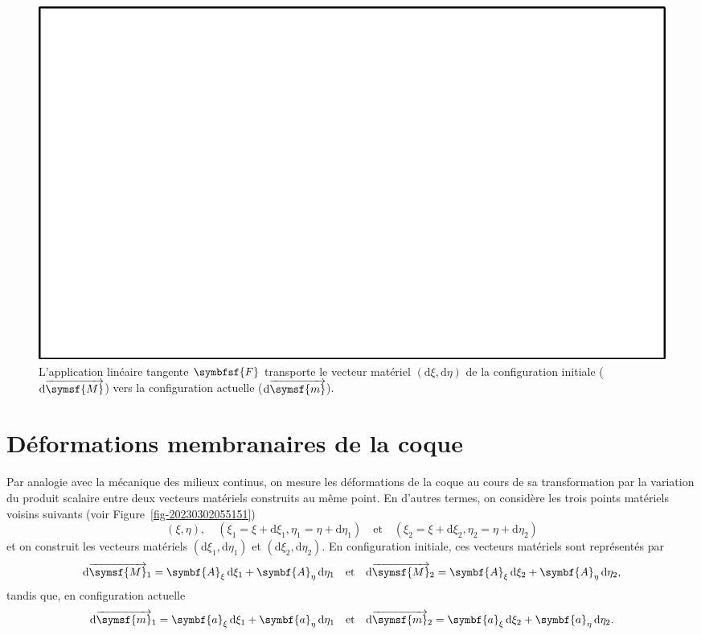 \documentclass[
  a4paper,
  DIV=11,
  numbers=noendperiod]{scrreprt}
\newcommand{\altvec}[1]{\overrightarrow{#1}}
\newcommand{\D}{{\mathrm d}}
\newcommand{\point}[1]{\symsf{#1}}
\newcommand{\tens}[1]{\symbfsf{#1}}
\renewcommand{\vec}[1]{\symbf{#1}}
\begin{document}
\begin{figure}

{\centering \includegraphics{croquis/blanc.pdf}

}

\caption{\label{fig-20230302054334}L'application linéaire tangente
\(\tens{F}\) transporte le vecteur matériel \((\D\xi, \D\eta)\) de la
configuration initiale (\(\D\altvec{\point{M}}\)) vers la configuration
actuelle (\(\D\altvec{\point{m}}\)).}

\end{figure}

\hypertarget{duxe9formations-membranaires-de-la-coque}{%
\section{Déformations membranaires de la
coque}\label{duxe9formations-membranaires-de-la-coque}}

Par analogie avec la mécanique des milieux continus, on mesure les
déformations de la coque au cours de sa transformation par la variation
du produit scalaire entre deux vecteurs matériels construits au même
point. En d'autres termes, on considère les trois points matériels
voisins suivants (voir Figure~\ref{fig-20230302055151}) \[
(\xi, \eta), \quad (\xi_1 = \xi + \D \xi_1, \eta_1 = \eta + \D \eta_1)
\quad \text{et} \quad
(\xi_2 = \xi + \D \xi_2, \eta_2 = \eta + \D \eta_2)
\] et on construit les vecteurs matériels \((\D \xi_1, \D \eta_1)\) et
\((\D \xi_2, \D \eta_2)\). En configuration initiale, ces vecteurs
matériels sont représentés par \[
\D\altvec{\point{M}}_1 = \vec{A}_\xi \, \D \xi_1 + \vec{A}_\eta \, \D \eta_1
\quad \text{et} \quad
\D\altvec{\point{M}}_2 = \vec{A}_\xi \, \D \xi_2 + \vec{A}_\eta \, \D \eta_2,
\] tandis que, en configuration actuelle \[
\D\altvec{\point{m}}_1 = \vec{a}_\xi \, \D \xi_1 + \vec{a}_\eta \, \D \eta_1
\quad \text{et} \quad
\D\altvec{\point{m}}_2 = \vec{a}_\xi \, \D \xi_2 + \vec{a}_\eta \, \D \eta_2.
\]
\end{document}
